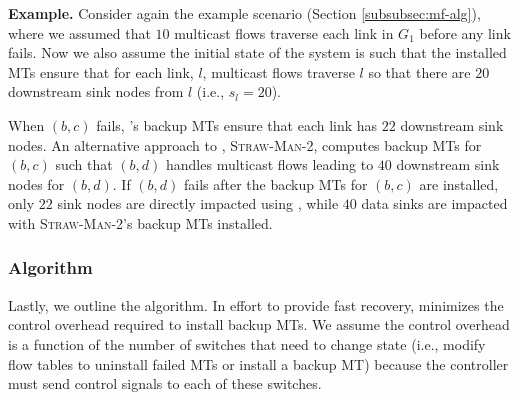 {\bf \md Example.} Consider again the \mf example scenario (Section \ref{subsubsec:mf-alg}), where we assumed that $10$ multicast flows traverse each link in 
$G_1$ before any link fails. Now we also assume the initial state of the system is such that the installed MTs ensure that for each link, $l$, multicast flows traverse $l$ so that there 
are $20$ downstream sink nodes from $l$ (i.e., $s_l = 20$). %

When $(b,c)$ fails, \mds's backup MTs ensure that each link has $22$ downstream sink nodes.  An alternative approach to \mds, \textsc{Straw-Man-2}, computes backup MTs 
for $(b,c)$ such that $(b,d)$ handles multicast flows leading to $40$ downstream sink nodes for $(b,d)$.  If $(b,d)$ fails after the backup MTs for $(b,c)$ are installed, only 
$22$ sink nodes are directly impacted using \mds, while $40$ data sinks are impacted with \textsc{Straw-Man-2}'s backup MTs installed.


\subsubsection{\mc Algorithm}
\label{subsubsec:mc-alg}

Lastly, we outline the \mc algorithm. In effort to provide fast recovery, \mc minimizes the control overhead required to install backup MTs.
We assume the control overhead is a function of the number of switches that need to change state (i.e., modify flow tables to uninstall
failed MTs or install a backup MT) because the controller must send control signals to each of these switches. %

